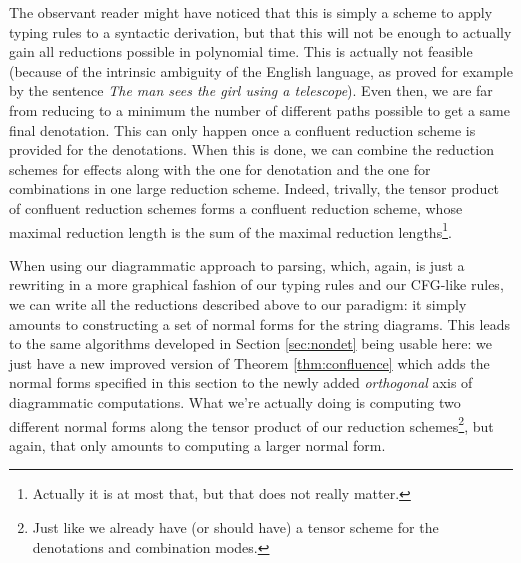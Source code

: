 \medskip

The observant reader might have noticed that this is simply a scheme to apply
typing rules to a syntactic derivation, but that this will not be enough to
actually gain all reductions possible in polynomial time.
This is actually not feasible (because of the intrinsic ambiguity of the
English language, as proved for example by the sentence \emph{The man sees the
	girl using a telescope}).
Even then, we are far from reducing to a minimum the number of different paths
possible to get a same final denotation.
This can only happen once a confluent reduction scheme is provided for the
denotations.
When this is done, we can combine the reduction schemes for effects along with
the one for denotation and the one for combinations in one large reduction
scheme.
Indeed, trivally, the tensor product of confluent reduction schemes forms a
confluent reduction scheme, whose maximal reduction length is the sum of the
maximal reduction lengths\footnote{Actually it is at most that, but that does
	not	really matter.}.

\medskip

When using our diagrammatic approach to parsing, which, again, is just a
rewriting in a more graphical fashion of our typing rules and our CFG-like
rules, we can write all the reductions described above to our paradigm:
it simply amounts to constructing a set of normal forms for the string diagrams.
This leads to the same algorithms developed in Section \ref{sec:nondet} being
usable here: we just have a new improved version of Theorem
\ref{thm:confluence} which adds the normal forms specified in this section to
the newly added \emph{orthogonal} axis of diagrammatic computations.
What we're actually doing is computing two different normal forms along the
tensor product of our reduction schemes\footnote{Just like we already have (or
	should have) a tensor scheme for the denotations and combination modes.},
but again, that only amounts to computing a larger normal form.
